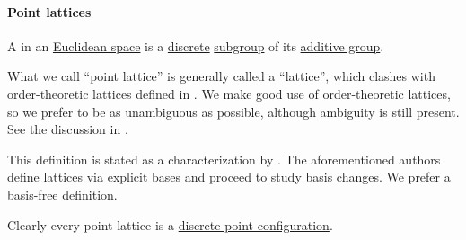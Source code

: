 \paragraph{Point lattices}

\begin{definition}\label{def:point_lattice}\mimprovised
  A  in an \hyperref[def:euclidean_space]{Euclidean space} is a \hyperref[def:discrete_set]{discrete} \hyperref[def:group/submodel]{subgroup} of its \hyperref[def:semiring]{additive group}.
\end{definition}
\begin{comments}
  \item What we call \enquote{point lattice} is generally called a \enquote{lattice}, which clashes with order-theoretic lattices defined in . We make good use of order-theoretic lattices, so we prefer to be as unambiguous as possible, although ambiguity is still present. See the discussion in .

  \item This definition is stated as a characterization by . The aforementioned authors define lattices via explicit bases and proceed to study basis changes. We prefer a basis-free definition.

  \item Clearly every point lattice is a \hyperref[def:point_configuration]{discrete point configuration}.
\end{comments}

